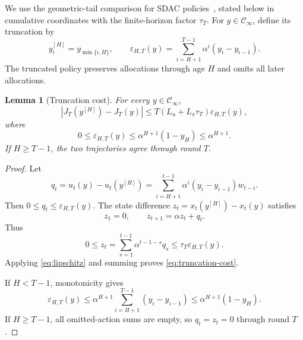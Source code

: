 \documentclass[11pt]{article}
\newtheorem{lemma}[theorem]{Lemma}
\newcommand{\CI}{\mathcal C_\infty}
\begin{document}
We use the geometric-tail comparison for SDAC
policies~\cite{asgari2026sdac}, stated below in cumulative coordinates
with the finite-horizon factor $\tau_T$.
For $y\in\CI$, define its truncation by
\begin{equation}
\label{eq:truncation}
y_i^{[H]}=y_{\min\{i,H\}},
\qquad
\varepsilon_{H,T}(y)
=
\sum_{i=H+1}^{T-1}\alpha^i(y_i-y_{i-1}).
\end{equation}
The truncated policy preserves allocations through age $H$
and omits all later allocations.

\begin{lemma}[Truncation cost]
\label{lem:truncation}
For every $y\in\CI$,
\begin{equation}
\label{eq:truncation-cost}
|J_T(y^{[H]})-J_T(y)|
\le
T(L_u+L_x\tau_T)\varepsilon_{H,T}(y),
\end{equation}
where
\begin{equation}
\label{eq:tail}
0\le\varepsilon_{H,T}(y)
\le\alpha^{H+1}(1-y_H)\le\alpha^{H+1}.
\end{equation}
If $H\ge T-1$, the two trajectories agree through round $T$.
\end{lemma}

\begin{proof}
Let
\[
q_t=u_t(y)-u_t(y^{[H]})
=
\sum_{i=H+1}^{t-1}\alpha^i(y_i-y_{i-1})w_{t-i}.
\]
Then $0\le q_t\le\varepsilon_{H,T}(y)$.
The state difference
$z_t=x_t(y^{[H]})-x_t(y)$ satisfies
\[
z_1=0,
\qquad
z_{t+1}=\alpha z_t+q_t.
\]
Thus
\[
0\le z_t
=\sum_{s=1}^{t-1}\alpha^{t-1-s}q_s
\le\tau_T\varepsilon_{H,T}(y).
\]
Applying \eqref{eq:lipschitz} and summing proves
\eqref{eq:truncation-cost}.

If $H<T-1$, monotonicity gives
\[
\varepsilon_{H,T}(y)
\le
\alpha^{H+1}
\sum_{i=H+1}^{T-1}(y_i-y_{i-1})
\le\alpha^{H+1}(1-y_H).
\]
If $H\ge T-1$, all omitted-action sums are empty, so
$q_t=z_t=0$ through round $T$.
\end{proof}
\end{document}
